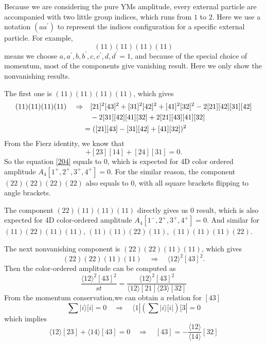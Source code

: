 \documentclass[12pt]{article}
\newcommand{\avg}[1]{\langle #1 \rangle}
\newcommand{\aket}[1]{|#1\rangle}
\newcommand{\cbrak}[2]{\avg{#1}\![#2]}
\newcommand{\abra}[1]{\langle #1|}
\newcommand{\sbra}[1]{[#1|}
\begin{document}
Because we are considering the pure YMs amplitude, every external particle are accompanied with two little group indices, which runs from $1$ to $2$. Here we use a notation $(aa^\prime)$ to represent the indices configuration for a specific external particle. For example,
\begin{equation}
    (11)(11)(11)(11)
\end{equation}
means we choose $a,a^\prime, b,b^\prime,c,c^\prime,d,d^\prime =1$, and because of the special choice of momentum, most of the components give vanishing result. Here we only show the nonvanishing results.

The first one is $(11)(11)(11)(11)$, which gives 
\begin{align}
    (11)(11)(11)(11)\quad\Rightarrow &\quad [21]^2[43]^2+[31]^2[42]^2+[41]^2[32]^2-2[21][42][31][42]\notag\\ &\quad-2[31][42][41][32]+2[21][43][41][32]\notag \\
    &=([21][43]-[31][42]+[41][32])^2
    \label{204}
\end{align}
From the Fierz identity, we know that
\begin{equation}
    [21][43]+[23][14]+[24][31]=0.
\end{equation}
So the equation \eqref{204} equals to 0, which is expected for 4D color ordered amplitude $A_4[1^+,2^+,3^+,4^+]=0$. For the similar reason, the component $(22)(22)(22)(22)$ also equals to 0, with all square brackets flipping to angle brackets.

The component $(22)(11)(11)(11)$ directly gives us 0 result, which is also expected for 4D color-ordered amplitude $A_4[1^-,2^+,3^+,4^+]=0$. And similar for $(11)(22)(11)(11)$, $(11)(11)(22)(11)$, $(11)(11)(11)(22)$.

The next nonvanishing component is $(22)(22)(11)(11)$, which gives
\begin{equation}
    (22)(22)(11)(11)\quad \Rightarrow \quad \avg{12}^2[43]^2.
\end{equation}
Then the color-ordered amplitude can be computed as 
\begin{equation}
    \frac{\avg{12}^2[43]^2}{st}=\frac{\avg{12}^2[43]^2}{\cbrak{12}{21}\cbrak{23}{32}}
\end{equation}
From the momentum conservation,we can obtain a relation for $[43]$
\begin{equation}
    \sum\aket{i}[i|=0\quad \Rightarrow \quad \abra{1}(\sum\aket{i}[i|)\sbra{3}=0
\end{equation}
which implies 
\begin{equation}
    \cbrak{12}{23}+\cbrak{14}{43}=0\quad \Rightarrow \quad [43]=-\frac{\avg{12}}{\avg{14}}[32]
\end{equation}
\end{document}
